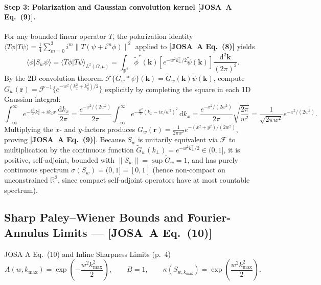 \documentclass[10pt,letterpaper]{article}
\newcommand{\braket}[2]{\langle #1 | #2 \rangle}
\newcommand{\norm}[1]{\lVert #1 \rVert}
\newcommand{\dd}{\mathrm{d}}
\newcommand{\josa}[1]{\textbf{[JOSA~A Eq.~(#1)]}}
\numberwithin{equation}{section}
\begin{document}
\paragraph*{Step 3: Polarization and Gaussian convolution kernel \josa{9}.}
For any bounded linear operator $T$, the polarization identity $\braket{T\phi}{T\psi} = \frac{1}{4}\sum_{m=0}^3 i^m \norm{T(\psi + i^m\phi)}^2$ applied to \josa{8} yields
\begin{equation}
  \braket{\phi}{S_w\psi} = \braket{T\phi}{T\psi}_{L^2(\Omega,\mu)} = \int_{\mathbb{R}^2} \widetilde{\phi}^*(\mathbf{k})\left[e^{-w^2 k_\perp^2/2}\widetilde{\psi}(\mathbf{k})\right]\frac{\dd^2\mathbf{k}}{(2\pi)^2}.
\end{equation}
By the 2D convolution theorem $\mathcal{F}\{G_w * \psi\}(\mathbf{k}) = \widetilde{G}_w(\mathbf{k})\widetilde{\psi}(\mathbf{k})$, compute $G_w(\mathbf{r}) = \mathcal{F}^{-1}\{e^{-w^2(k_x^2+k_y^2)/2}\}$ explicitly by completing the square in each 1D Gaussian integral:
\begin{equation}
  \int_{-\infty}^\infty e^{-\frac{w^2}{2}k_x^2 + i k_x x}\,\frac{\dd k_x}{2\pi} = \frac{e^{-x^2/(2w^2)}}{2\pi}\int_{-\infty}^\infty e^{-\frac{w^2}{2}(k_x - ix/w^2)^2}\,\dd k_x = \frac{e^{-x^2/(2w^2)}}{2\pi}\sqrt{\frac{2\pi}{w^2}} = \frac{1}{\sqrt{2\pi w^2}}e^{-x^2/(2w^2)}.
\end{equation}
Multiplying the $x$- and $y$-factors produces $G_w(\mathbf{r}) = \frac{1}{2\pi w^2}e^{-(x^2+y^2)/(2w^2)}$, proving \josa{9}. Because $S_w$ is unitarily equivalent via $\mathcal{F}$ to multiplication by the continuous function $\widetilde{G}_w(k_\perp) = e^{-w^2 k_\perp^2/2} \in (0,1]$, it is positive, self-adjoint, bounded with $\norm{S_w} = \sup\widetilde{G}_w = 1$, and has purely continuous spectrum $\sigma(S_w) = \overline{(0,1]} = [0,1]$ (hence non-compact on unconstrained $\mathbb{R}^2$, since compact self-adjoint operators have at most countable spectrum).

\subsection{Sharp Paley--Wiener Bounds and Fourier-Annulus Limits --- \josa{10}}
\label{sec:s3_pw}

\begin{targeteq}{JOSA A Eq.~(10) and Inline Sharpness Limits (p.~4)}
\[
  A(w,k_{\max}) = \exp\!\left(-\frac{w^2 k_{\max}^2}{2}\right), \qquad B = 1, \qquad \kappa(S_{w,k_{\max}}) = \exp\!\left(\frac{w^2 k_{\max}^2}{2}\right).
\]
\end{targeteq}
\end{document}
